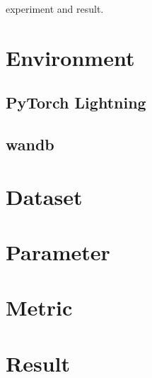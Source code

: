 \hspace{24pt}

experiment and result.

\section{Environment} \label{sec:environment}
\subsection{PyTorch Lightning} \label{sec:lightning}
\subsection{wandb} \label{sec:wandb}

\section{Dataset} \label{sec:dataset}

\section{Parameter} \label{sec:parameter}

\section{Metric} \label{sec:metric}

\section{Result} \label{sec:result}